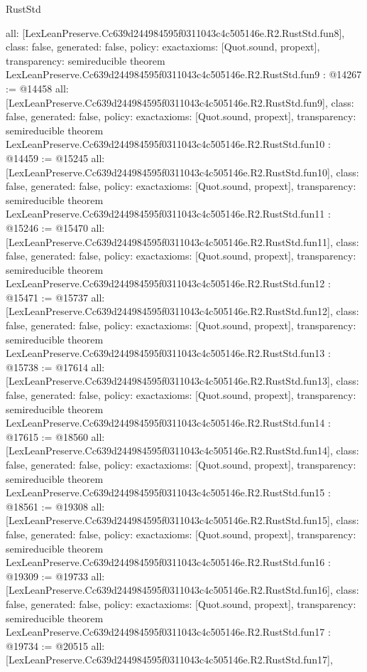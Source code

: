 \begin{lexlean}{RustStd}
\begin{coremodule}
{  all: [LexLeanPreserve.Cc639d244984595f0311043c4c505146e.R2.RustStd.fun8],
  class: false,
  generated: false,
  policy: exact{axioms: [Quot.sound, propext]},
  transparency: semireducible
}
theorem LexLeanPreserve.Cc639d244984595f0311043c4c505146e.R2.RustStd.fun9 : @14267 := @14458 {
  all: [LexLeanPreserve.Cc639d244984595f0311043c4c505146e.R2.RustStd.fun9],
  class: false,
  generated: false,
  policy: exact{axioms: [Quot.sound, propext]},
  transparency: semireducible
}
theorem LexLeanPreserve.Cc639d244984595f0311043c4c505146e.R2.RustStd.fun10 : @14459 := @15245 {
  all: [LexLeanPreserve.Cc639d244984595f0311043c4c505146e.R2.RustStd.fun10],
  class: false,
  generated: false,
  policy: exact{axioms: [Quot.sound, propext]},
  transparency: semireducible
}
theorem LexLeanPreserve.Cc639d244984595f0311043c4c505146e.R2.RustStd.fun11 : @15246 := @15470 {
  all: [LexLeanPreserve.Cc639d244984595f0311043c4c505146e.R2.RustStd.fun11],
  class: false,
  generated: false,
  policy: exact{axioms: [Quot.sound, propext]},
  transparency: semireducible
}
theorem LexLeanPreserve.Cc639d244984595f0311043c4c505146e.R2.RustStd.fun12 : @15471 := @15737 {
  all: [LexLeanPreserve.Cc639d244984595f0311043c4c505146e.R2.RustStd.fun12],
  class: false,
  generated: false,
  policy: exact{axioms: [Quot.sound, propext]},
  transparency: semireducible
}
theorem LexLeanPreserve.Cc639d244984595f0311043c4c505146e.R2.RustStd.fun13 : @15738 := @17614 {
  all: [LexLeanPreserve.Cc639d244984595f0311043c4c505146e.R2.RustStd.fun13],
  class: false,
  generated: false,
  policy: exact{axioms: [Quot.sound, propext]},
  transparency: semireducible
}
theorem LexLeanPreserve.Cc639d244984595f0311043c4c505146e.R2.RustStd.fun14 : @17615 := @18560 {
  all: [LexLeanPreserve.Cc639d244984595f0311043c4c505146e.R2.RustStd.fun14],
  class: false,
  generated: false,
  policy: exact{axioms: [Quot.sound, propext]},
  transparency: semireducible
}
theorem LexLeanPreserve.Cc639d244984595f0311043c4c505146e.R2.RustStd.fun15 : @18561 := @19308 {
  all: [LexLeanPreserve.Cc639d244984595f0311043c4c505146e.R2.RustStd.fun15],
  class: false,
  generated: false,
  policy: exact{axioms: [Quot.sound, propext]},
  transparency: semireducible
}
theorem LexLeanPreserve.Cc639d244984595f0311043c4c505146e.R2.RustStd.fun16 : @19309 := @19733 {
  all: [LexLeanPreserve.Cc639d244984595f0311043c4c505146e.R2.RustStd.fun16],
  class: false,
  generated: false,
  policy: exact{axioms: [Quot.sound, propext]},
  transparency: semireducible
}
theorem LexLeanPreserve.Cc639d244984595f0311043c4c505146e.R2.RustStd.fun17 : @19734 := @20515 {
  all: [LexLeanPreserve.Cc639d244984595f0311043c4c505146e.R2.RustStd.fun17],
}
\end{coremodule}
\end{lexlean}
